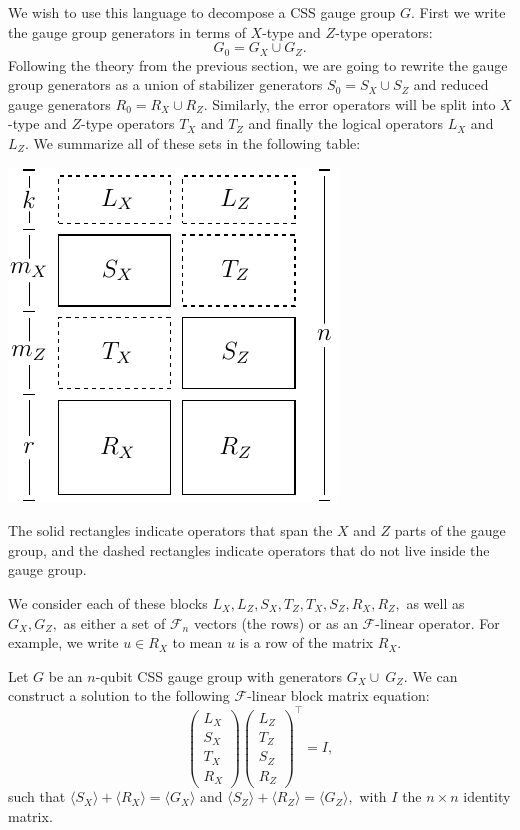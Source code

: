 \documentclass[11pt,oneside]{article}
\def\Span#1{\langle #1 \rangle}
\newcommand{\Field}{\mathcal{F}}
\def\Fr{\Field^r}
\def\Fnd{\Field_{n}}
\newcommand\dotheorem[1]{\vskip 5pt \noindent {\bf \underline{Theorem #1.}\ }}
\begin{document}
We wish to use this language to decompose a CSS gauge group $G.$
First we write the gauge group generators in terms of
$X$-type and $Z$-type operators:
$$
    G_0 = G_X \cup G_Z.
$$
Following the theory from the previous section,
we are going to rewrite the gauge group generators
as a union of stabilizer generators $S_0 = S_X \cup S_Z$
and reduced gauge generators $R_0 = R_X \cup R_Z.$
Similarly, the error operators
will be split into $X$-type and $Z$-type
operators $T_X$ and $T_Z$ and
finally the logical operators
$L_X$ and $L_Z.$
We summarize all of these sets
in the following table:
\begin{center}
\includegraphics[]{pic-symplectic.pdf}
\end{center}
The solid rectangles indicate operators that
span the $X$ and $Z$ parts of the gauge group,
and the dashed rectangles indicate operators that
do not live inside the gauge group.

We consider each of these blocks 
$L_X, L_Z, S_X, T_Z, T_X, S_Z, R_X, R_Z,$
as well as $G_X,G_Z,$
as either a set of $\Fnd$ vectors (the rows) or as an 
$\Field$-linear operator.
For example, we write $u\in R_X$ to mean $u$ is 
a row of the matrix $R_X$.

\dotheorem{(Decomposition)}
Let $G$ be an $n$-qubit 
CSS gauge group with generators $G_X\cup~G_Z.$
We can construct a solution to the following $\Field$-linear
block matrix equation:
\begin{equation}%
\left( \begin{array}{l}
L_X\\
S_X\\
T_X\\
R_X
\end{array} \right)
\left( \begin{array}{l}
L_Z\\
T_Z\\
S_Z\\
R_Z
\end{array} \right)^\top =
I,
\end{equation}
such that 
$\Span{S_X}+\Span{R_X} = \Span{G_X}$
and 
$\Span{S_Z}+\Span{R_Z} = \Span{G_Z},$
with $I$ the $n\times n$ identity matrix.
\end{document}
